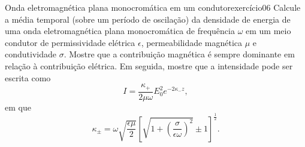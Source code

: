 \begin{exercício}{Onda eletromagnética plana monocromática em um condutor}{exercício06}
    Calcule a média temporal (sobre um período de oscilação) da densidade de energia de uma onda eletromagnética plana monocromática de frequência \(\omega\) em um meio condutor de permissividade elétrica \(\epsilon\), permeabilidade magnética \(\mu\) e condutividade \(\sigma\). Mostre que a contribuição magnética é sempre dominante em relação à contribuição elétrica. Em seguida, mostre que a intensidade pode ser escrita como
    \begin{equation*}
        I = \frac{\kappa_+}{2\mu \omega} E_0^2 e^{-2 \kappa_-z},
    \end{equation*}
    em que
    \begin{equation*}
        \kappa_\pm = \omega \sqrt{\frac{\epsilon \mu}{2}}\left[\sqrt{1 + \left(\frac{\sigma}{\epsilon \omega}\right)^2} \pm 1\right]^{\frac12}.
    \end{equation*}
\end{exercício}
